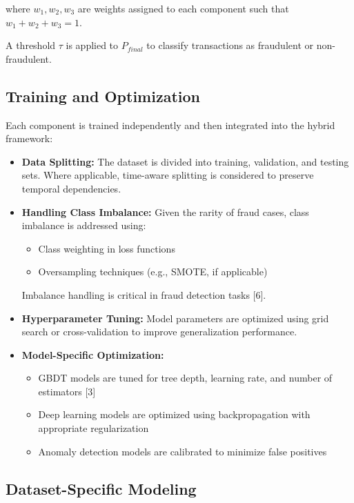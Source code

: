 \documentclass[conference]{IEEEtran}
\begin{document}
where $w_1, w_2, w_3$ are weights assigned to each component such that $w_1 + w_2 + w_3 = 1$.

A threshold $\tau$ is applied to $P_{final}$ to classify transactions as fraudulent or non-fraudulent.

\subsection{Training and Optimization}

Each component is trained independently and then integrated into the hybrid framework:

\begin{itemize}
    \item \textbf{Data Splitting:}  
    The dataset is divided into training, validation, and testing sets. Where applicable, time-aware splitting is considered to preserve temporal dependencies.

    \item \textbf{Handling Class Imbalance:}  
    Given the rarity of fraud cases, class imbalance is addressed using:
    \begin{itemize}
        \item Class weighting in loss functions
        \item Oversampling techniques (e.g., SMOTE, if applicable)
    \end{itemize}
    Imbalance handling is critical in fraud detection tasks [6].

    \item \textbf{Hyperparameter Tuning:}  
    Model parameters are optimized using grid search or cross-validation to improve generalization performance.

    \item \textbf{Model-Specific Optimization:}
    \begin{itemize}
        \item GBDT models are tuned for tree depth, learning rate, and number of estimators [3]
        \item Deep learning models are optimized using backpropagation with appropriate regularization
        \item Anomaly detection models are calibrated to minimize false positives
    \end{itemize}
\end{itemize}

\subsection{Dataset-Specific Modeling}
\end{document}
